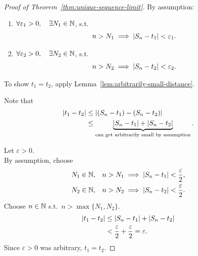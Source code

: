\newpage
\begin{proof}[Proof of Theorem~\ref{thm:unique-sequence-limit}]
  By assumption:
  \begin{enumerate}[proofparts]
    \item $\forall\varepsilon_1>0,\quad\exists N_1\in\mathbb{N}$, s.t.
          \[
            n>N_1\implies\left\lvert S_n-t_1 \right\rvert<\varepsilon_1.
          \]
    \item $\forall\varepsilon_2>0,\quad\exists N_2\in\mathbb{N}$, s.t.
          \[
            n>N_2\implies\left\lvert S_n-t_2 \right\rvert<\varepsilon_2.
          \]
  \end{enumerate}
  To show $t_1=t_2$, apply Lemma~\ref{lem:arbitrarily-small-distance}.

  \begin{thinking}
    Note that
    \begin{align*}
      \left\lvert t_1-t_2 \right\rvert
       & \le\left\lvert (S_n-t_1)-(S_n-t_2) \right\rvert                  \\
       & \le\underbrace{\left\lvert S_n-t_1 \right\rvert+\left\lvert S_n-t_2 \right\rvert}_{
        \text{can get arbitrarily small by assumption}}.
    \end{align*}
    \begin{center}
    \end{center}
  \end{thinking}

  Let $\varepsilon>0$.\\
  By assumption, choose
  \begin{align*}
    N_1\in\mathbb{N}, & \quad n>N_1\implies\left\lvert S_n-t_1 \right\rvert<\frac\varepsilon2, \\
    N_2\in\mathbb{N}, & \quad n>N_2\implies\left\lvert S_n-t_2 \right\rvert<\frac\varepsilon2.
  \end{align*}
  Choose $n\in\mathbb{N}$ s.t.\ $n>\max\{N_1,N_2\}$.
  \begin{align*}
    \left\lvert t_1-t_2 \right\rvert
     & \le\left\lvert S_n-t_1 \right\rvert+\left\lvert S_n-t_2 \right\rvert                    \\
     & <\frac\varepsilon2+\frac\varepsilon2=\varepsilon.
  \end{align*}
  Since $\varepsilon>0$ was arbitrary, $t_1=t_2$.
\end{proof}

